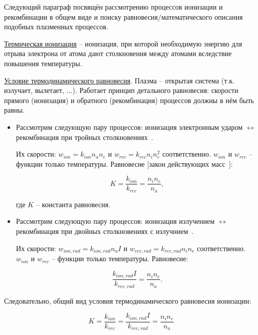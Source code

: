 \documentclass[10pt, a4paper]{article}
\begin{document}
Следующий параграф посвящён рассмотрению процессов ионизации и рекомбинации в общем виде и поиску равновесия/математического описания подобных плазменных процессов.

\uline{Термическая ионизация} -- ионизация, при которой необходимую энергию для отрыва электрона от атома дают столкновения между атомами вследствие повышения температуры.

\uline{Условие термодинамического равновесия}. Плазма -- открытая система (т.к. излучает, вылетает, ...). Работает принцип детального равновесия: скорости прямого (ионизация) и обратного (рекомбинация) процессов должны в нём быть равны.

\begin{itemize}

\item Рассмотрим следующую пару процессов: ионизация электронным ударом $\leftrightarrow$ рекомбинация при тройных столкновениях~\cite{frank}.

Их скорости: $w_{ion} = k_{ion}n_an_e$ и $w_{rec} = k_{rec}n_in_e^2$ соответственно. $w_{ion}$ и $w_{rec}$ -- функции только температуры. Равновесие [закон действующих масс~\cite{frank}]:
 
\begin{equation} \label{eq:detailed_balance}
	K = \frac{k_{ion}}{k_{rec}} = \frac{n_in_e}{n_a},
\end{equation}

где $K$ -- константа равновесия. 

\item Рассмотрим следующую пару процессов: ионизация излучением $\leftrightarrow$ рекомбинация при двойных столкновениях с излучнием~\cite{frank}.

Их скорости: $w_{ion, rad} = k_{ion, rad}n_aI$ и $w_{rec, rad} = k_{rec, rad}n_in_e$ соответственно. $w_{ion}$ и $w_{rec}$ -- функции только температуры. Равновесие:

\begin{equation}
	\frac{k_{ion, rad}I}{k_{rec, rad}} = \frac{n_in_e}{n_a}.
\end{equation} 

\end{itemize}

Следовательно, общий вид условия термодинамического равновесия ионизации:

\begin{equation}
	K = \frac{k_{ion}}{k_{rec}} = \frac{k_{ion, rad}I}{k_{rec, rad}} = \frac{n_in_e}{n_a}
\end{equation}
\end{document}
